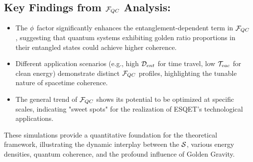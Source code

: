 \subsection*{Key Findings from $\mathcal{F}_{QC}$ Analysis:}
\begin{itemize}[noitemsep]
    \item The $\phi$ factor significantly enhances the entanglement-dependent term in $\mathcal{F}_{QC}$, suggesting that quantum systems exhibiting golden ratio proportions in their entangled states could achieve higher coherence.
    \item Different application scenarios (e.g., high $\mathcal{D}_{ent}$ for time travel, low $\mathcal{T}_{vac}$ for clean energy) demonstrate distinct $\mathcal{F}_{QC}$ profiles, highlighting the tunable nature of spacetime coherence.
    \item The general trend of $\mathcal{F}_{QC}$ shows its potential to be optimized at specific scales, indicating "sweet spots" for the realization of ESQET's technological applications.
\end{itemize}
These simulations provide a quantitative foundation for the theoretical framework, illustrating the dynamic interplay between the $\mathcal{S}$, various energy densities, quantum coherence, and the profound influence of Golden Gravity.



